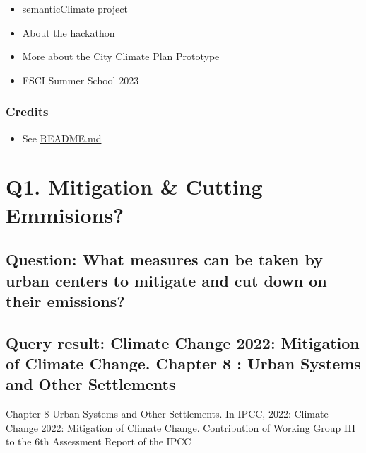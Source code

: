 \documentclass[
  letterpaper,
  DIV=11,
  numbers=noendperiod]{scrreprt}
\providecommand{\tightlist}{%
  \setlength{\itemsep}{0pt}\setlength{\parskip}{0pt}}\usepackage{longtable,booktabs,array}
\begin{document}
\begin{itemize}
\tightlist
\item
  semanticClimate project
\item
  About the hackathon
\item
  More about the City Climate Plan Prototype
\item
  FSCI Summer School 2023
\end{itemize}

\hypertarget{credits}{%
\subsection{Credits}\label{credits}}

\begin{itemize}
\tightlist
\item
  See
  \href{https://github.com/semanticClimate/city-climate-plans-notebook/blob/main/README.md}{README.md}
\end{itemize}


\hypertarget{q1.-mitigation-cutting-emmisions}{%
\chapter{Q1. Mitigation \& Cutting
Emmisions?}\label{q1.-mitigation-cutting-emmisions}}

\hypertarget{question-what-measures-can-be-taken-by-urban-centers-to-mitigate-and-cut-down-on-their-emissions}{%
\section{Question: What measures can be taken by urban centers to
mitigate and cut down on their
emissions?}\label{question-what-measures-can-be-taken-by-urban-centers-to-mitigate-and-cut-down-on-their-emissions}}

\hypertarget{query-result-climate-change-2022-mitigation-of-climate-change.-chapter-8-urban-systems-and-other-settlements}{%
\section{Query result: Climate Change 2022: Mitigation of Climate
Change. Chapter 8 : Urban Systems and Other
Settlements}\label{query-result-climate-change-2022-mitigation-of-climate-change.-chapter-8-urban-systems-and-other-settlements}}

Chapter 8 Urban Systems and Other Settlements. In IPCC, 2022: Climate
Change 2022: Mitigation of Climate Change. Contribution of Working Group
III to the 6th Assessment Report of the IPCC
\end{document}
